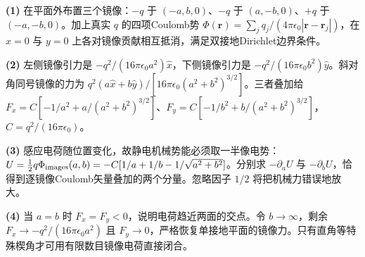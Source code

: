 \par\noindent\textbf{(1)} 在平面外布置三个镜像：\(-q\) 于 \((-a,b,0)\)、\(-q\) 于 \((a,-b,0)\)、\(+q\) 于 \((-a,-b,0)\)。加上真实 \(q\) 的四项Coulomb势 \(\Phi(\boldsymbol r)=\sum_jq_j/(4\pi\epsilon_0|\boldsymbol r-\boldsymbol r_j|)\)，在 \(x=0\) 与 \(y=0\) 上各对镜像贡献相互抵消，满足双接地Dirichlet边界条件。
\par\noindent\textbf{(2)} 左侧镜像引力是 \(-q^2/(16\pi\epsilon_0a^2)\hat x\)，下侧镜像引力是 \(-q^2/(16\pi\epsilon_0b^2)\hat y\)。斜对角同号镜像的力为 \(q^2(a\hat x+b\hat y)/[16\pi\epsilon_0(a^2+b^2)^{3/2}]\)。三者叠加给 \(F_x=C[-1/a^2+a/(a^2+b^2)^{3/2}]\)、\(F_y=C[-1/b^2+b/(a^2+b^2)^{3/2}]\)，\(C=q^2/(16\pi\epsilon_0)\)。
\par\noindent\textbf{(3)} 感应电荷随位置变化，故静电机械势能必须取一半像电势：\(U=\tfrac12q\Phi_{\rm images}(a,b)=-C[1/a+1/b-1/\sqrt{a^2+b^2}]\)。分别求 \(-\partial_aU\) 与 \(-\partial_bU\)，恰得到逐镜像Coulomb矢量叠加的两个分量。忽略因子 \(1/2\) 将把机械力错误地放大。
\par\noindent\textbf{(4)} 当 \(a=b\) 时 \(F_x=F_y<0\)，说明电荷趋近两面的交点。令 \(b\to\infty\)，剩余 \(F_x\to-q^2/(16\pi\epsilon_0a^2)\) 且 \(F_y\to0\)，严格恢复单接地平面的镜像力。只有直角等特殊楔角才可用有限数目镜像电荷直接闭合。
